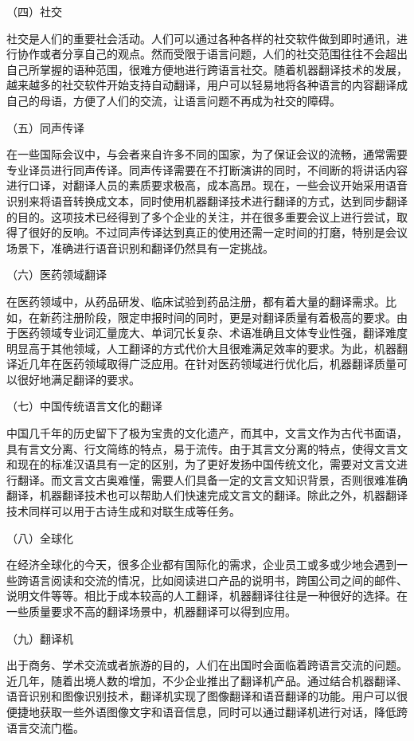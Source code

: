 \parinterval （四）社交

\parinterval 社交是人们的重要社会活动。人们可以通过各种各样的社交软件做到即时通讯，进行协作或者分享自己的观点。然而受限于语言问题，人们的社交范围往往不会超出自己所掌握的语种范围，很难方便地进行跨语言社交。随着机器翻译技术的发展，越来越多的社交软件开始支持自动翻译，用户可以轻易地将各种语言的内容翻译成自己的母语，方便了人们的交流，让语言问题不再成为社交的障碍。

\parinterval （五）同声传译

\parinterval 在一些国际会议中，与会者来自许多不同的国家，为了保证会议的流畅，通常需要专业译员进行同声传译。同声传译需要在不打断演讲的同时，不间断的将讲话内容进行口译，对翻译人员的素质要求极高，成本高昂。现在，一些会议开始采用语音识别来将语音转换成文本，同时使用机器翻译技术进行翻译的方式，达到同步翻译的目的。这项技术已经得到了多个企业的关注，并在很多重要会议上进行尝试，取得了很好的反响。不过同声传译达到真正的使用还需一定时间的打磨，特别是会议场景下，准确进行语音识别和翻译仍然具有一定挑战。

\parinterval （六）医药领域翻译

\parinterval 在医药领域中，从药品研发、临床试验到药品注册，都有着大量的翻译需求。比如，在新药注册阶段，限定申报时间的同时，更是对翻译质量有着极高的要求。由于医药领域专业词汇量庞大、单词冗长复杂、术语准确且文体专业性强，翻译难度明显高于其他领域，人工翻译的方式代价大且很难满足效率的要求。为此，机器翻译近几年在医药领域取得广泛应用。在针对医药领域进行优化后，机器翻译质量可以很好地满足翻译的要求。

\parinterval （七）中国传统语言文化的翻译

\parinterval 中国几千年的历史留下了极为宝贵的文化遗产，而其中，文言文作为古代书面语，具有言文分离、行文简练的特点，易于流传。由于其言文分离的特点，使得文言文和现在的标准汉语具有一定的区别，为了更好发扬中国传统文化，需要对文言文进行翻译。而文言文古奥难懂，需要人们具备一定的文言文知识背景，否则很难准确翻译，机器翻译技术也可以帮助人们快速完成文言文的翻译。除此之外，机器翻译技术同样可以用于古诗生成和对联生成等任务。

\parinterval （八）全球化

\parinterval 在经济全球化的今天，很多企业都有国际化的需求，企业员工或多或少地会遇到一些跨语言阅读和交流的情况，比如阅读进口产品的说明书，跨国公司之间的邮件、说明文件等等。相比于成本较高的人工翻译，机器翻译往往是一种很好的选择。在一些质量要求不高的翻译场景中，机器翻译可以得到应用。

\parinterval （九）翻译机

\parinterval 出于商务、学术交流或者旅游的目的，人们在出国时会面临着跨语言交流的问题。近几年，随着出境人数的增加，不少企业推出了翻译机产品。通过结合机器翻译、语音识别和图像识别技术，翻译机实现了图像翻译和语音翻译的功能。用户可以很便捷地获取一些外语图像文字和语音信息，同时可以通过翻译机进行对话，降低跨语言交流门槛。

